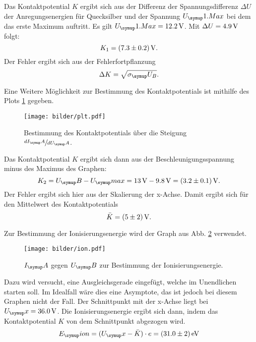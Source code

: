 Das Kontaktpotential $K$ ergibt sich aus der Differenz der Spannungsdifferenz $\Delta U$
der Anregungsenergien für Quecksilber und der Spannung $U_\su{1.Max}$ bei dem das
erste Maximum auftritt. Es gilt $U_\su{1.Max} = 12.2\Volt$. Mit $\Delta U = 4.9\,\si{\volt}$
folgt:
\begin{equation}
  K_1 = (7.3\pm0.2)\,\si{\volt}.
\end{equation}
Der Fehler ergibt sich aus der Fehlerfortpflanzung
\begin{equation}
  \Delta K = \sqrt{\sigma_\su{U_B}}.
\end{equation}

Eine Weitere Möglichkeit zur Bestimmung des Kontaktpotentials ist mithilfe
des Plots \ref{fig:plot} gegeben.
\begin{figure}
  \centering
  \texttt{[image: bilder/plt.pdf]}
  \caption{Bestimmung des Kontaktpotentials über die Steigung $\sfrac{dI_\su{A}}{dU_\su{A}}$.}
  \label{fig:plot}
\end{figure}
Das Kontaktpotential $K$ ergibt sich dann aus der Beschleunigungsspannung minus
des Maximus des Graphen:
\begin{equation}
  K_2 = U_\su{B} - U_\su{max} = 13\Volt - 9.8\Volt = (3.2\pm0.1)\Volt.
\end{equation}
Der Fehler ergibt sich hier aus der Skalierung der x-Achse.
Damit ergibt sich für den Mittelwert des Kontaktpotentials
\begin{equation}
  \bar{K} = (5 \pm 2) \,\si{\volt}.
\end{equation}

Zur Bestimmung der Ionisierungsenergie wird der Graph aus Abb. \ref{fig:ion}
verwendet.
\begin{figure}
  \centering
  \texttt{[image: bilder/ion.pdf]}
  \caption{$I_\su{A}$ gegen $U_\su{B}$ zur Bestimmung der Ionisierungsenergie.}
  \label{fig:ion}
\end{figure}
Dazu wird versucht, eine Ausgleichsgerade eingefügt, welche im Unendlichen starten
soll. Im Idealfall wäre dies eine Asymptote, das ist jedoch bei diesem Graphen nicht
der Fall. Der Schnittpunkt mit der x-Achse liegt bei $U_\su{x} = 36.0 \Volt$.
Die Ionisierungsenergie ergibt sich dann, indem das Kontaktpotential $K$ von
dem Schnittpunkt abgezogen wird.
\begin{equation}
  E_\su{ion} = (U_\su{x}-\bar{K}) \cdot e = (31.0\pm2)\eV
\end{equation}
